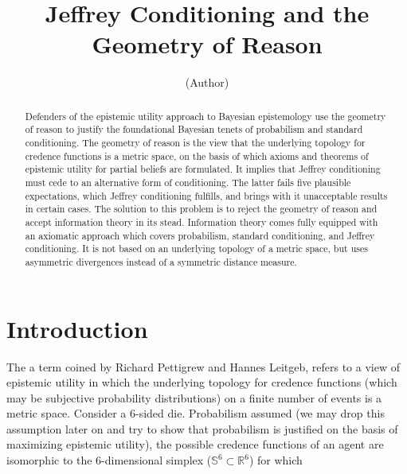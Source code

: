 \documentclass[11pt]{article}
\begin{document}


\title{Jeffrey Conditioning and the Geometry of Reason}
\author{(Author)}
\date{}
\maketitle
{}

\begin{abstract}
  {\noindent}Defenders of the epistemic utility approach to Bayesian
  epistemology use the geometry of reason to justify the foundational
  Bayesian tenets of probabilism and standard conditioning. The
  geometry of reason is the view that the underlying topology for
  credence functions is a metric space, on the basis of which axioms
  and theorems of epistemic utility for partial beliefs are
  formulated. It implies that Jeffrey conditioning must cede to an
  alternative form of conditioning. The latter fails five plausible
  expectations, which Jeffrey conditioning fulfills, and brings with
  it unacceptable results in certain cases. The solution to this
  problem is to reject the geometry of reason and accept information
  theory in its stead. Information theory comes fully equipped with an
  axiomatic approach which covers probabilism, standard conditioning,
  and Jeffrey conditioning. It is not based on an underlying topology
  of a metric space, but uses asymmetric divergences instead of a
  symmetric distance measure.
\end{abstract}

\section{Introduction}
\label{intr}

The  a term coined by Richard Pettigrew and
Hannes Leitgeb, refers to a view of epistemic utility in which the
underlying topology for credence functions (which may be subjective
probability distributions) on a finite number of events is a metric
space. Consider a 6-sided die. Probabilism assumed (we may drop this
assumption later on and try to show that probabilism is justified on
the basis of maximizing epistemic utility), the possible credence
functions of an agent are isomorphic to the 6-dimensional simplex
($\mathbb{S}^6\subset\mathbb{R}^6$) for which
\end{document}
